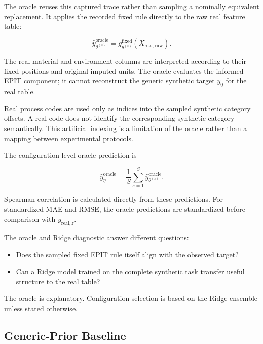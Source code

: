 \documentclass{article}
\begin{document}
The oracle reuses this captured trace rather than sampling a nominally equivalent replacement. It applies the recorded fixed rule directly to the raw real feature table:

\begin{equation}
\widehat y_{\theta^{(s)}}^{\mathrm{oracle}}
=
g_{\theta^{(s)}}^{\mathrm{fixed}}
\left(
X_{\mathrm{real,raw}}
\right).
\label{eq:theta-oracle-prediction}
\end{equation}

The real material and environment columns are interpreted according to their fixed positions and original imputed units. The oracle evaluates the informed EPIT component; it cannot reconstruct the generic synthetic target \(y_0\) for the real table.

Real process codes are used only as indices into the sampled synthetic category offsets. A real code does not identify the corresponding synthetic category semantically. This artificial indexing is a limitation of the oracle rather than a mapping between experimental protocols.

The configuration-level oracle prediction is

\begin{equation}
\widehat y_{\eta}^{\mathrm{oracle}}
=
\frac{1}{S}
\sum_{s=1}^{S}
\widehat y_{\theta^{(s)}}^{\mathrm{oracle}}.
\label{eq:uniform-oracle-ensemble}
\end{equation}

Spearman correlation is calculated directly from these predictions. For standardized MAE and RMSE, the oracle predictions are standardized before comparison with \(y_{\mathrm{real},z}\).

The oracle and Ridge diagnostic answer different questions:

\begin{itemize}
    \item Does the sampled fixed EPIT rule itself align with the observed target?
    \item Can a Ridge model trained on the complete synthetic task transfer useful structure to the real table?
\end{itemize}

The oracle is explanatory. Configuration selection is based on the Ridge ensemble unless stated otherwise.

\subsection{Generic-Prior Baseline}
\end{document}
